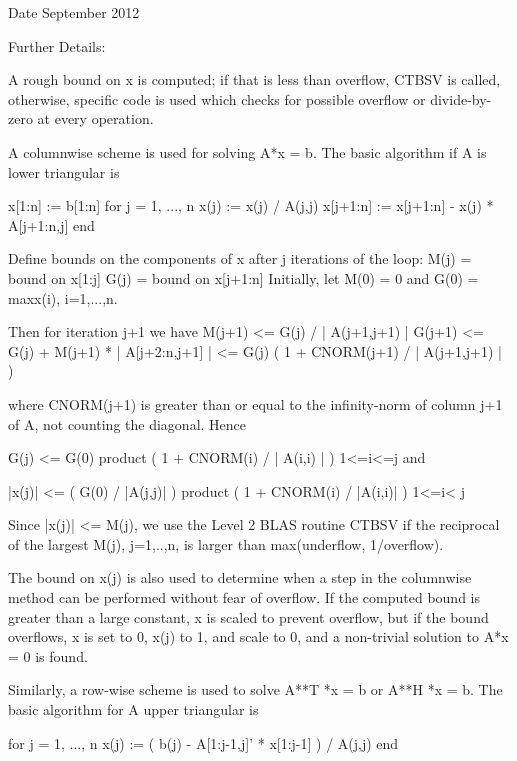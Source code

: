 \begin{DoxyDate}{Date}
September 2012 
\end{DoxyDate}
\begin{DoxyParagraph}{Further Details\+: }
\begin{DoxyVerb}  A rough bound on x is computed; if that is less than overflow, CTBSV
  is called, otherwise, specific code is used which checks for possible
  overflow or divide-by-zero at every operation.

  A columnwise scheme is used for solving A*x = b.  The basic algorithm
  if A is lower triangular is

       x[1:n] := b[1:n]
       for j = 1, ..., n
            x(j) := x(j) / A(j,j)
            x[j+1:n] := x[j+1:n] - x(j) * A[j+1:n,j]
       end

  Define bounds on the components of x after j iterations of the loop:
     M(j) = bound on x[1:j]
     G(j) = bound on x[j+1:n]
  Initially, let M(0) = 0 and G(0) = max{x(i), i=1,...,n}.

  Then for iteration j+1 we have
     M(j+1) <= G(j) / | A(j+1,j+1) |
     G(j+1) <= G(j) + M(j+1) * | A[j+2:n,j+1] |
            <= G(j) ( 1 + CNORM(j+1) / | A(j+1,j+1) | )

  where CNORM(j+1) is greater than or equal to the infinity-norm of
  column j+1 of A, not counting the diagonal.  Hence

     G(j) <= G(0) product ( 1 + CNORM(i) / | A(i,i) | )
                  1<=i<=j
  and

     |x(j)| <= ( G(0) / |A(j,j)| ) product ( 1 + CNORM(i) / |A(i,i)| )
                                   1<=i< j

  Since |x(j)| <= M(j), we use the Level 2 BLAS routine CTBSV if the
  reciprocal of the largest M(j), j=1,..,n, is larger than
  max(underflow, 1/overflow).

  The bound on x(j) is also used to determine when a step in the
  columnwise method can be performed without fear of overflow.  If
  the computed bound is greater than a large constant, x is scaled to
  prevent overflow, but if the bound overflows, x is set to 0, x(j) to
  1, and scale to 0, and a non-trivial solution to A*x = 0 is found.

  Similarly, a row-wise scheme is used to solve A**T *x = b  or
  A**H *x = b.  The basic algorithm for A upper triangular is

       for j = 1, ..., n
            x(j) := ( b(j) - A[1:j-1,j]' * x[1:j-1] ) / A(j,j)
       end


\end{DoxyVerb}
\end{DoxyParagraph}
